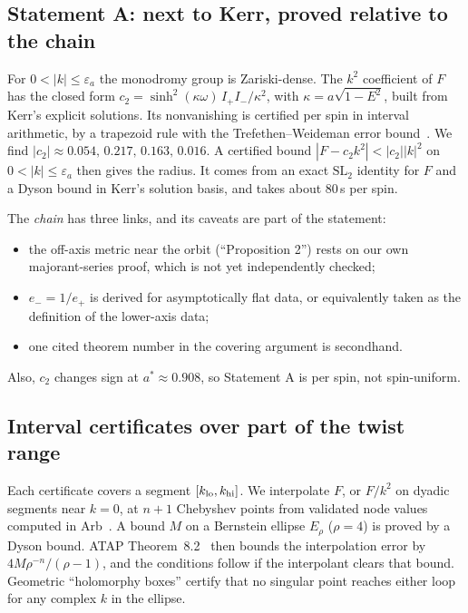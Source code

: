 \documentclass[11pt,a4paper]{article}
\begin{document}
\subsection{Statement A: next to Kerr, proved relative to the chain}
For $0<|k|\le\varepsilon_a$ the monodromy group is Zariski-dense. The $k^2$ coefficient of $F$ has the closed form
$c_2=\sinh^2(\kappa\omega)\,I_+I_-/\kappa^2$, with $\kappa=a\sqrt{1-E^2}$, built from Kerr's explicit solutions.
Its nonvanishing is certified per spin in interval arithmetic, by a trapezoid rule with the Trefethen--Weideman
error bound~\cite{TrefethenWeideman2014}. We find $|c_2|\approx0.054,\,0.217,\,0.163,\,0.016$. A certified bound
$|F-c_2k^2|<|c_2||k|^2$ on $0<|k|\le\varepsilon_a$ then gives the radius. It comes from an exact $\mathrm{SL}_2$
identity for $F$ and a Dyson bound in Kerr's solution basis, and takes about 80\,s per spin.

The \emph{chain} has three links, and its caveats are part of the statement:
\begin{itemize}
\item the off-axis metric near the orbit (``Proposition 2'') rests on our own majorant-series proof, which is not
yet independently checked;
\item $e_-=1/e_+$ is derived for asymptotically flat data, or equivalently taken as the definition of the lower-axis
data;
\item one cited theorem number in the covering argument is secondhand.
\end{itemize}
Also, $c_2$ changes sign at $a^*\approx0.908$, so Statement A is per spin, not spin-uniform.

\subsection{Interval certificates over part of the twist range}
Each certificate covers a segment $[k_{\rm lo},k_{\rm hi}]$. We interpolate $F$, or $F/k^2$ on dyadic segments near
$k=0$, at $n+1$ Chebyshev points from validated node values computed in Arb~\cite{Arb2017}. A bound $M$ on a
Bernstein ellipse $E_\rho$ ($\rho=4$) is proved by a Dyson bound. ATAP Theorem~8.2~\cite{ATAP} then bounds the
interpolation error by $4M\rho^{-n}/(\rho-1)$, and the conditions follow if the interpolant clears that bound.
Geometric ``holomorphy boxes'' certify that no singular point reaches either loop for any complex $k$ in the
ellipse.
\end{document}
